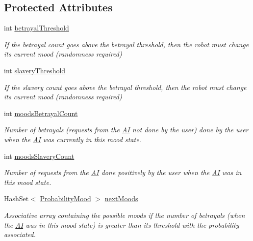 \subsection*{Protected Attributes}
\begin{DoxyCompactItemize}
\item 
int \hyperlink{classgameplay_1_1ai_1_1mood_1_1_mood_af8ba28f8a5e568f223c07e0acb788be9}{betrayal\-Threshold}
\begin{DoxyCompactList}\small\item\em If the betrayal count goes above the betrayal threshold, then the robot must change its current mood (randomness required) \end{DoxyCompactList}\item 
int \hyperlink{classgameplay_1_1ai_1_1mood_1_1_mood_a12c9abed7c077f9013956cda08e41619}{slavery\-Threshold}
\begin{DoxyCompactList}\small\item\em If the slavery count goes above the betrayal threshold, then the robot must change its current mood (randomness required) \end{DoxyCompactList}\item 
int \hyperlink{classgameplay_1_1ai_1_1mood_1_1_mood_ae300727f17efc1d32e7cc1731f9935fa}{moods\-Betrayal\-Count}
\begin{DoxyCompactList}\small\item\em Number of betrayals (requests from the \hyperlink{classgameplay_1_1ai_1_1_a_i}{A\-I} not done by the user) done by the user when the \hyperlink{classgameplay_1_1ai_1_1_a_i}{A\-I} was currently in this mood state. \end{DoxyCompactList}\item 
int \hyperlink{classgameplay_1_1ai_1_1mood_1_1_mood_a0bfc4bebdf6767b8c32e747ec21da39e}{moods\-Slavery\-Count}
\begin{DoxyCompactList}\small\item\em Number of requests from the \hyperlink{classgameplay_1_1ai_1_1_a_i}{A\-I} done positively by the user when the \hyperlink{classgameplay_1_1ai_1_1_a_i}{A\-I} was in this mood state. \end{DoxyCompactList}\item 
Hash\-Set$<$ \hyperlink{classgameplay_1_1ai_1_1mood_1_1_probability_mood}{Probability\-Mood} $>$ \hyperlink{classgameplay_1_1ai_1_1mood_1_1_mood_af19cdc9b24293b9d7898d66720b8e0e7}{next\-Moods}
\begin{DoxyCompactList}\small\item\em Associative array containing the possible moods if the number of betrayals (when the \hyperlink{classgameplay_1_1ai_1_1_a_i}{A\-I} was in this mood state) is greater than its threshold with the probability associated. \end{DoxyCompactList}\item 

\end{DoxyCompactItemize}
